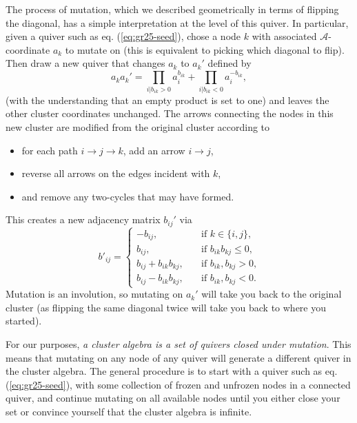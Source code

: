 \documentclass[11pt]{article}
\def\a{\mathcal{A}}
\begin{document}
The process of mutation, which we described geometrically in terms of flipping the diagonal, has a simple interpretation at the level of this quiver. In particular, given a quiver such as eq. (\ref{eq:gr25-seed}), chose a node $k$ with associated $\a$-coordinate $a_k$ to mutate on (this is equivalent to picking which diagonal to flip). Then draw a new quiver that changes $a_{k}$ to $a_{k}'$ defined by
\begin{equation}
  \label{eq:mutation}
  a_{k} a_{k}' = \prod_{i \vert b_{i k} > 0} a_{i}^{b_{i k}} + \prod_{i \vert b_{i k} < 0} a_{i}^{-b_{i k}},
\end{equation} (with the understanding that an empty product is set to one) and leaves the other cluster coordinates unchanged. The arrows connecting the nodes in this new cluster are modified from the original cluster according to
\begin{itemize}
	\item for each path $i\to j \to k$, add an arrow $i\to j$,
	\item reverse all arrows on the edges incident with $k$,
	\item and remove any two-cycles that may have formed.
\end{itemize}
This creates a new adjacency matrix $b_{ij}'$ via 
\begin{equation}
  \label{eq:b-mutation}
  b'_{i j} =
  \begin{cases}
    -b_{i j}, &\quad \text{if $k \in \lbrace i, j\rbrace$,}\\
    b_{i j}, &\quad \text{if $b_{i k} b_{k j} \leq 0$,}\\
    b_{i j} + b_{i k} b_{k j}, &\quad \text{if $b_{i k}, b_{k j} > 0$,}\\
    b_{i j} - b_{i k} b_{k j}, &\quad \text{if $b_{i k}, b_{k j} < 0$.}
  \end{cases}
\end{equation}
Mutation is an involution, so mutating on $a_k'$ will take you back to the original cluster (as flipping the same diagonal twice will take you back to where you started). 

For our purposes, \emph{a cluster algebra is a set of quivers closed under mutation}. This means that mutating on any node of any quiver will generate a different quiver in the cluster algebra. The general procedure is to start with a quiver such as eq. (\ref{eq:gr25-seed}), with some collection of frozen and unfrozen nodes in a connected quiver, and continue mutating on all available nodes until you either close your set or convince yourself that the cluster algebra is infinite. 
\end{document}
